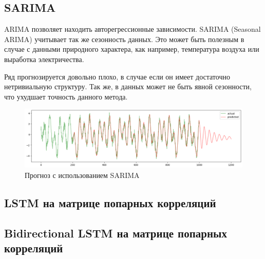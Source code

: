 \documentclass{article}
\begin{document}
\subsection{SARIMA}

ARIMA позволяет находить авторегрессионные зависимости. SARIMA (Seasonal ARIMA) учитывает так же сезонность данных. Это может быть полезным в случае с данными природного характера, как например, температура воздуха или выработка электричества.

Ряд прогнозируется довольно плохо, в случае если он имеет достаточно нетривиальную структуру. Так же, в данных может не быть явной сезонности, что ухудшает точность данного метода.

\begin{figure}[H]
	\centering
	\includegraphics[width=\textwidth]{SARIMA-prediction.png}
	\caption{Прогноз с использованием SARIMA}
	\label{fig:fig2}
\end{figure}

\subsection{LSTM на матрице попарных корреляций}

\subsection{Bidirectional LSTM на матрице попарных корреляций}





\end{document}
